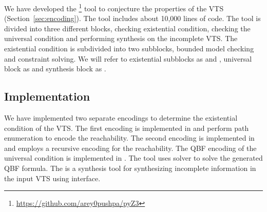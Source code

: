 %
\noindent We have developed the {\vtstool}\footnote{{\url{https://github.com/arey0pushpa/pyZ3}}} tool to conjecture the properties of the VTS (Section~\ref{sec:encoding}). 
%
%
The {\vtstool} tool includes about 10,000 lines of code.
%
The tool is divided into three different blocks,
%
checking existential condition, checking the universal condition and performing synthesis on the incomplete VTS. 
%
The existential condition is subdivided into two subblocks, bounded model checking and constraint solving. 
%
We will refer to existential subblocks as {\sattool} and {\smttool}, universal block as {\qbftool} and synthesis block as {\ourtool}.
%


\subsection{Implementation}
\noindent We have implemented two separate encodings to determine the existential condition of the VTS. 
%
The first encoding is implemented in {\sattool}
and perform path enumeration to encode the reachability. 
%
%
The second encoding is implemented in {\smttool} and employs a recursive encoding
for the reachability. 
%
%
%
The QBF encoding of the universal condition is implemented in {\qbftool}.
%
The tool uses {\depqbf} solver to solve the generated QBF formula. 
%
The {\ourtool} is a synthesis tool for synthesizing incomplete information in the input VTS using {\qbftool} interface.
%

